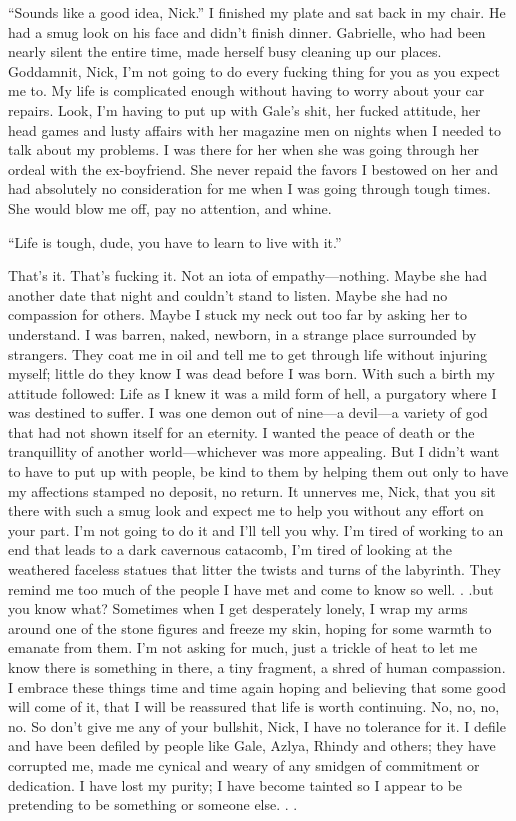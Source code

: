 ``Sounds like a good idea, Nick.'' I finished my plate and sat back in
my chair. He had a smug look on his face and didn't finish dinner.
Gabrielle, who had been nearly silent the entire time, made herself busy
cleaning up our places. Goddamnit, Nick, I'm not going to do every
fucking thing for you as you expect me to. My life is complicated enough
without having to worry about your car repairs. Look, I'm having to put
up with Gale's shit, her fucked attitude, her head games and lusty
affairs with her magazine men on nights when I needed to talk about my
problems. I was there for her when she was going through her ordeal with
the ex-boyfriend. She never repaid the favors I bestowed on her and had
absolutely no consideration for me when I was going through tough times.
She would blow me off, pay no attention, and whine.

``Life is tough, dude, you have to learn to live with it.''

That's it. That's fucking it. Not an iota of empathy---nothing. Maybe
she had another date that night and couldn't stand to listen. Maybe she
had no compassion for others. Maybe I stuck my neck out too far by
asking her to understand. I was barren, naked, newborn, in a strange
place surrounded by strangers. They coat me in oil and tell me to get
through life without injuring myself; little do they know I was dead
before I was born. With such a birth my attitude followed: Life as I
knew it was a mild form of hell, a purgatory where I was destined to
suffer. I was one demon out of nine---a devil---a variety of god that
had not shown itself for an eternity. I wanted the peace of death or the
tranquillity of another world---whichever was more appealing. But I
didn't want to have to put up with people, be kind to them by helping
them out only to have my affections stamped no deposit, no return. It
unnerves me, Nick, that you sit there with such a smug look and expect
me to help you without any effort on your part. I'm not going to do it
and I'll tell you why. I'm tired of working to an end that leads to a
dark cavernous catacomb, I'm tired of looking at the weathered faceless
statues that litter the twists and turns of the labyrinth. They remind
me too much of the people I have met and come to know so well. . .but
you know what? Sometimes when I get desperately lonely, I wrap my arms
around one of the stone figures and freeze my skin, hoping for some
warmth to emanate from them. I'm not asking for much, just a trickle of
heat to let me know there is something in there, a tiny fragment, a
shred of human compassion. I embrace these things time and time again
hoping and believing that some good will come of it, that I will be
reassured that life is worth continuing. No, no, no, no. So don't give
me any of your bullshit, Nick, I have no tolerance for it. I defile and
have been defiled by people like Gale, Azlya, Rhindy and others; they
have corrupted me, made me cynical and weary of any smidgen of
commitment or dedication. I have lost my purity; I have become tainted
so I appear to be pretending to be something or someone else. . .

